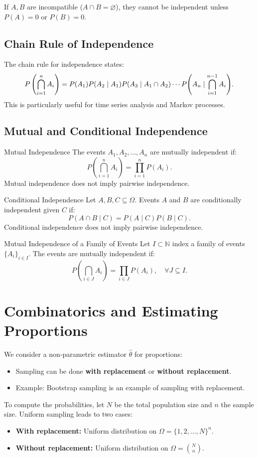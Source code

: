 \begin{rmk}
If \(A, B\) are incompatible (\(A \cap B = \varnothing\)), they cannot be independent unless \(P(A) = 0\) or \(P(B) = 0\).
\end{rmk}


\subsection{Chain Rule of Independence}
The chain rule for independence states:
\[
P\left(\bigcap_{i=1}^n A_i\right) = P(A_1) P(A_2 \mid A_1) P(A_3 \mid A_1 \cap A_2) \cdots P\qty(A_n \mid \bigcap_{i=1}^{n-1} A_i).
\]
This is particularly useful for time series analysis and Markov processes.

\subsection{Mutual and Conditional Independence}

\begin{df}{Mutual Independence}
The events \(A_1, A_2, \dots, A_n\) are mutually independent if:
\[
P\left(\bigcap_{i=1}^n A_i\right) = \prod_{i=1}^n P(A_i).
\]
Mutual independence does not imply pairwise independence.
\end{df}

\begin{df}{Conditional Independence}
Let \(A, B, C \subseteq \Omega\). Events \(A\) and \(B\) are conditionally independent given \(C\) if:
\[
P(A \cap B \mid C) = P(A \mid C) P(B \mid C).
\]
Conditional independence does not imply pairwise independence.
\end{df}

\begin{df}{Mutual Independence of a Family of Events}
Let \(I \subset \mathbb{N}\) index a family of events \(\{A_i\}_{i \in I}\). The events are mutually independent if:
\[
P\left(\bigcap_{i \in J} A_i\right) = \prod_{i \in J} P(A_i), \quad \forall J \subseteq I.
\]
\end{df}

\newpage
\section{Combinatorics and Estimating Proportions}

We consider a non-parametric estimator \(\hat{\theta}\) for proportions:
\begin{itemize}
    \item Sampling can be done \textbf{with replacement} or \textbf{without replacement}.
    \item Example: Bootstrap sampling is an example of sampling with replacement.
\end{itemize}
To compute the probabilities, let \(N\) be the total population size and \(n\) the sample size. Uniform sampling leads to two cases:
\begin{itemize}
    \item \textbf{With replacement:} Uniform distribution on \(\Omega = \{1, 2, \dots, N\}^n\).
    \item \textbf{Without replacement:} Uniform distribution on \(\Omega = \binom{N}{n}\).
\end{itemize}


